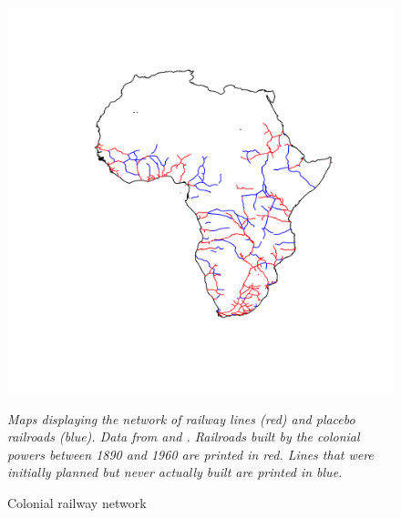 \documentclass[11pt, oneside]{article}   	%
\newcommand{\mysubcaption}[1]{
\justify
\begin{spacing}{0.7}
\textit{\footnotesize #1}
\end{spacing}}
\begin{document}
\begin{figure}[!ph]
\centering
\caption{Colonial railway network}
\includegraphics[width=.6\textwidth,trim={10cm 11cm 6cm 10cm},clip]{../../Analysis/output/other_maps/all_rails.png}
\label{fig:Railroad_Map}
\mysubcaption{Maps displaying the network of railway lines (red) and placebo railroads (blue). Data from \cite{Jedwab_PermanentEffectsTransportation_2016a} and \cite{Herranz-Loncan_publicbenefitRailways_2017}. Railroads built by the colonial powers between 1890 and 1960 are printed in red. Lines that were initially planned but never actually built are printed in blue.}
\end{figure}
\end{document}
